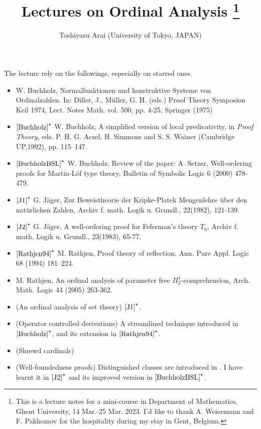 \documentclass{article}
\title{
Lectures on Ordinal Analysis
\thanks{This is a lecture notes for a mini-course in Department of Mathematics, Ghent University,
14 Mar.-25 Mar. 2023.
I'd like to thank A. Weiermann and F. Pakhomov for the hospitality during my stay in Gent, Belgium.
}
}
\author{Toshiyasu Arai (University of Tokyo, JAPAN)
}
\date{}
\begin{document}
\maketitle





The lecture rely on the followings, especially on starred ones.

\begin{itemize}

\item
\cite{Buchholz75}
W. Buchholz, 
Normalfunktionen und konstruktive Systeme von Ordinalzahlen.
In: Diller, J., M\"uller, G. H. (eds.)
Proof Theory Symposion Keil 1974, Lect. Notes Math. vol. 500, pp. 4-25, Springer (1975)

\item
$\mbox{\cite{Buchholz}}^{\star}$ W. Buchholz, 
A simplified version of local predicativity, 
in \textit{Proof Theory},
eds. P. H. G. Aczel, H. Simmons and S. S. Wainer
(Cambridge UP,1992), pp. 115--147.

\item
$\mbox{\cite{BuchholzBSL}}^{\star}$
W. Buchholz, Review of the paper: A. Setzer, Well-ordering proofs for Martin-L\"of type theory, Bulletin of Symbolic Logic 6 (2000) 478-479.

\item
$\mbox{\cite{J1}}^{\star}$
G. J\"ager, Zur Beweistheorie der Kripke-Platek Mengenlehre \"uber den nat\"urlichen Zahlen, 
Archiv f. math. Logik u. Grundl., 22(1982), 121-139.

\item
$\mbox{\cite{J2}}^{\star}$
G. J\"ager, 
A well-ordering proof for Feferman's theory $T_{0}$, 
Archiv f. math. Logik u. Grundl., 23(1983), 65-77.


\item
$\mbox{\cite{Rathjen94}}^{\star}$
M. Rathjen, 
Proof theory of reflection, 
Ann. Pure Appl. Logic 68 (1994) 181--224.

\item
\cite{RathjenAFML2}
M. Rathjen, 
An ordinal analysis of parameter free $\Pi^{1}_{2}$-comprehension,
Arch. Math. Logic 44 (2005) 263-362.

\item
(An ordinal analysis of set theory)
$\mbox{\cite{J1}}^{\star}$.

\item
(Operator controlled derivations)
A streamlined technique introduced in $\mbox{\cite{Buchholz}}^{\star}$, and
its extension in
$\mbox{\cite{Rathjen94}}^{\star}$.

\item
(Shrewd cardinals)
\cite{RathjenAFML2}

\item
(Well-foundedness proofs)
Distinguished classes are introduced in \cite{Buchholz75}.
I have learnt it in $\mbox{\cite{J2}}^{\star}$ and its improved version in
$\mbox{\cite{BuchholzBSL}}^{\star}$.

\end{itemize}
\end{document}
